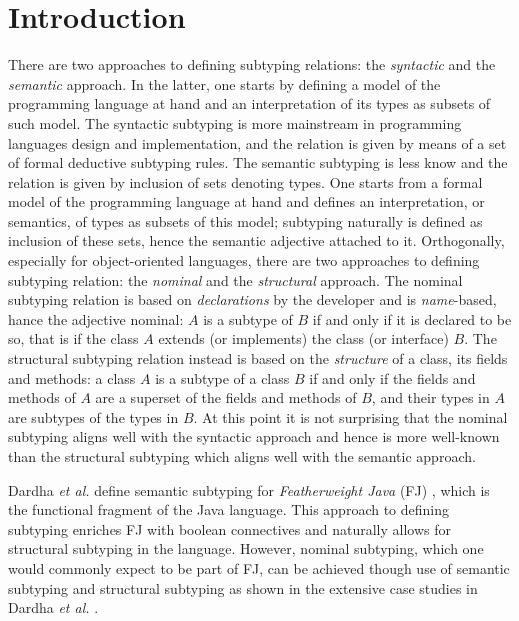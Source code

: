 \documentclass[runningheads]{llncs}
\begin{document}
\section{Introduction}
There are two approaches to defining subtyping relations: the \emph{syntactic} and the \emph{semantic} approach.
In the latter, one starts by defining a model of the programming language at hand and an interpretation of its types as subsets of such model.
The syntactic subtyping is more mainstream in programming languages design and implementation, and the relation is given by means of a set of formal deductive subtyping rules.
The semantic subtyping is less know and the relation is given by inclusion of sets denoting types. One starts from a formal model of the programming language at hand and defines an interpretation, or semantics, of types as subsets of this model; subtyping naturally is defined as inclusion of these sets, hence the semantic adjective attached to it.
Orthogonally, especially for object-oriented languages, there are two approaches to defining subtyping relation: the \emph{nominal} and the \emph{structural} approach.
The nominal subtyping relation is based on \emph{declarations} by the developer and is \emph{name}-based, hance the adjective nominal: $A$ is a subtype of $B$ if and only if it is declared to be so, that is if the class $A$ extends (or implements) the class (or interface) $B$.
The structural subtyping relation instead is based on the \emph{structure} of a class, its fields and methods: a class $A$ is a subtype of a class $B$ if and only if the fields and methods of $A$ are a superset of the fields and methods of $B$, and their types in $A$ are subtypes of the types in $B$.
At this point it is not surprising that the nominal subtyping aligns well with the syntactic approach and hence is more well-known than the structural subtyping which aligns well with the semantic approach.

Dardha \emph{et al.} \cite{Dardha2013,Dardha2017} define semantic subtyping for \emph{Featherweight Java} (FJ) \cite{featherweight}, which is the functional fragment of the Java language.
This approach to defining subtyping enriches FJ with boolean connectives and naturally allows for structural subtyping in the language.
However, nominal subtyping, which one would  commonly expect to be part of FJ, can be achieved though use of semantic subtyping and structural subtyping as shown in the extensive case studies in Dardha \emph{et al.} \cite[\S 8.4]{Dardha2017}.
\end{document}

